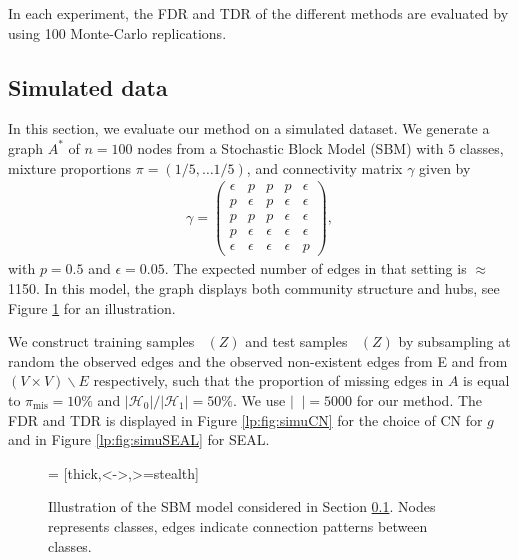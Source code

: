 \documentclass[a4paper, 11pt]{article}
\theoremstyle{remark}
\DeclareMathOperator{\Dtr}{\cD_{\text{train}}}
\DeclareMathOperator{\Dcal}{\cD_{\text{cal}}}
\DeclareMathOperator{\Dtest}{\cD_{\text{test}}}
\newcommand{\EM}{\ensuremath}
\newcommand{\cD}{\EM{\mathcal{D}}}
\newcommand{\cH}{\EM{\mathcal{H}}}
\begin{document}
 In each experiment, the FDR and TDR of the different methods are evaluated by using 100 Monte-Carlo replications. 

\subsection{Simulated data} \label{lp:sec:simu}
In this section, we evaluate our method on a simulated dataset. 
We generate a graph $A^*$ of $n=100$ nodes from a Stochastic Block Model (SBM) with $5$ classes, mixture proportions $\pi = (1/5, \dots 1/5)$, and connectivity matrix $\gamma$ given by
\begin{align*}
\gamma = 
\begin{pmatrix}
\epsilon &p &p &p & \epsilon \\
p & \epsilon & p & \epsilon & \epsilon \\
p &p &p &\epsilon & \epsilon \\
p &\epsilon &\epsilon &\epsilon &\epsilon \\
\epsilon &\epsilon &\epsilon &\epsilon &p 
\end{pmatrix}, 
\end{align*}
with $p=0.5$ and $\epsilon=0.05$. The expected number of edges in that setting is $\approx$ 1150. 
In this model, the graph displays both community structure and hubs, see Figure \ref{lp:fig:sbm} for an illustration. %

We construct training samples $\Dtr(Z)$ and test samples $\Dtest(Z)$ by subsampling at random the observed edges and the observed non-existent edges %
from E and from $(V \times V) \backslash E$ respectively,
such that the proportion of missing edges in $A$ is equal to $\pi_{\text{mis}} = 10\%$ and $\vert \cH_0 \vert / \vert \cH_1 \vert = 50\%$. We use $\vert \Dcal \vert = 5000$ for our method. The FDR and TDR is displayed in Figure \ref{lp:fig:simuCN} for the choice of CN for $g$ and in Figure \ref{lp:fig:simuSEAL} for SEAL.  


\begin{figure}
 = [thick,<->,>=stealth]

\centering
{}
\caption{Illustration of the SBM model considered in Section \ref{lp:sec:simu}. Nodes represents classes, edges indicate connection patterns between classes. }
\label{lp:fig:sbm}
\end{figure}
\end{document}
